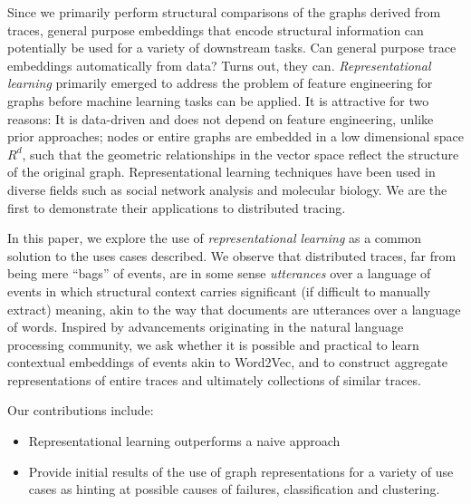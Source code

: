 Since we primarily perform structural comparisons of the graphs derived from traces, general purpose embeddings that encode structural information can potentially be used for a variety of downstream tasks. Can general purpose trace embeddings automatically from data? Turns out, they can. \emph{Representational learning} primarily emerged to address the problem of feature engineering for graphs before machine learning tasks can be applied. It is attractive for two reasons: It is data-driven and does not depend on feature engineering, unlike prior approaches; nodes or entire graphs are embedded in a low dimensional space $R^{d}$, such that the geometric relationships in the vector space reflect the structure of the original graph. Representational learning techniques have been used in diverse fields such as social network analysis and molecular biology. We are the first to demonstrate their applications to distributed tracing. 

In this paper, we explore the use of \emph{representational learning} as a common solution to the uses cases described.  We observe that distributed traces, far from being mere ``bags'' of events, are in some sense \emph{utterances} over a language of events in which structural context carries significant (if difficult to manually extract) meaning, akin to the way that documents are utterances over a language of words. Inspired by advancements originating in the natural language processing community, we ask whether it is possible and practical to learn contextual embeddings of events akin to Word2Vec, and to construct aggregate representations of entire traces and ultimately collections of 
similar traces.

Our contributions include:
\begin{itemize}
\item Representational learning outperforms a naive approach 
\item Provide initial results of the use of graph representations for a variety of use cases as hinting at possible causes of failures, classification and clustering.
\end{itemize}